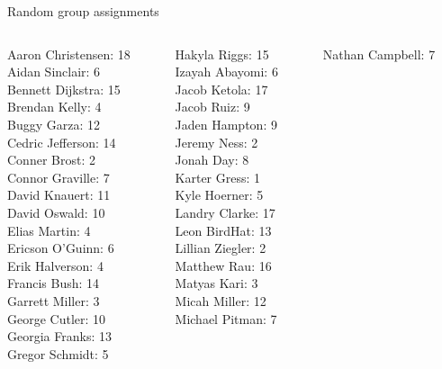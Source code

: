 \documentclass[10pt]{beamer}
\begin{document}
\begin{frame}{Random group assignments}
\footnotesize
\begin{columns}
\begin{column}{0.33\textwidth}
Aaron Christensen: 18 \\ 
Aidan Sinclair: 6 \\ 
Bennett Dijkstra: 15 \\ 
Brendan Kelly: 4 \\ 
Buggy Garza: 12 \\ 
Cedric Jefferson: 14 \\ 
Conner Brost: 2 \\ 
Connor Graville: 7 \\ 
David Knauert: 11 \\ 
David Oswald: 10 \\ 
Elias Martin: 4 \\ 
Ericson O'Guinn: 6 \\ 
Erik Halverson: 4 \\ 
Francis Bush: 14 \\ 
Garrett Miller: 3 \\ 
George Cutler: 10 \\ 
Georgia Franks: 13 \\ 
Gregor Schmidt: 5 \\\end{column}
\begin{column}{0.33\textwidth}
Hakyla Riggs: 15 \\ 
Izayah Abayomi: 6 \\ 
Jacob Ketola: 17 \\ 
Jacob Ruiz: 9 \\ 
Jaden Hampton: 9 \\ 
Jeremy Ness: 2 \\ 
Jonah Day: 8 \\ 
Karter Gress: 1 \\ 
Kyle Hoerner: 5 \\ 
Landry Clarke: 17 \\ 
Leon BirdHat: 13 \\ 
Lillian Ziegler: 2 \\ 
Matthew Rau: 16 \\ 
Matyas Kari: 3 \\ 
Micah Miller: 12 \\ 
Michael Pitman: 7 \\\end{column}
\begin{column}{0.33\textwidth}
Nathan Campbell: 7 \\ 

\end{column}
\end{columns}
\end{frame}
\end{document}
